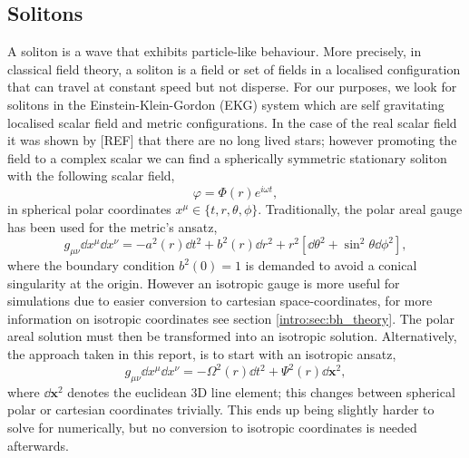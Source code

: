 \subsection{Solitons} \label{boson:sec:soliton}
A soliton is a wave that exhibits particle-like behaviour. More precisely, in classical field theory, a soliton
is a field or set of fields in a localised configuration that can travel at constant speed but not disperse. For
our purposes, we look for solitons in the Einstein-Klein-Gordon (EKG) system which are self gravitating
localised scalar field and metric configurations. In the case of the real scalar field it was shown by [REF] that
there are no long lived stars; however promoting the field to a complex scalar we can find a spherically
symmetric stationary soliton with the following scalar field,
\begin{equation} \varphi = \Phi(r)e^{i\omega t}, \label{boson:eq:fieldansatz} \end{equation}
in spherical polar coordinates $x^\mu \in \{t,r,\theta,\phi \}$.
Traditionally, the polar areal gauge has been used for the metric's ansatz,
\begin{equation}g_{\mu\nu}\dd x^\mu \dd x^\nu =- a^2(r)\dd t^2 + b^2(r) \dd r^2 + r^2 \left[ \dd \theta^2 + \sin^2\theta \dd \phi^2\right],\label{boson:eq:polaransatz}\end{equation}
where the boundary condition $b^2(0)=1$ is demanded to avoid a conical singularity at the origin. However an isotropic gauge is more useful for simulations due to easier conversion to cartesian space-coordinates, for more information on isotropic coordinates see section \ref{intro:sec:bh_theory}. The polar areal solution must then be transformed into an isotropic solution. Alternatively, the approach taken in this report, is to start with an isotropic ansatz,
\begin{equation} g_{\mu\nu}\dd x^\mu \dd x^\nu =- \Omega^2(r)\dd t^2 + \Psi^2(r)\dd \bm{x}^2,\label{boson:eq:metricansatz}\end{equation}
where $\dd \bm{x}^2$ denotes the euclidean 3D line element; this changes between spherical polar or cartesian coordinates trivially. This ends up being slightly harder to solve for numerically, but no conversion to isotropic coordinates is needed afterwards.

